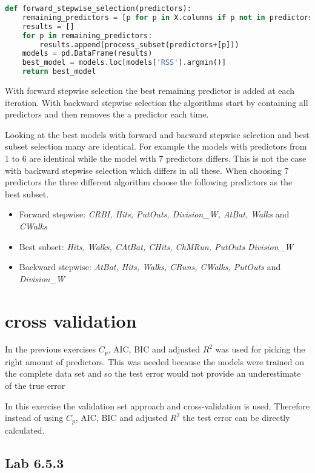 \begin{lstlisting}[language=Python, label=lst:forwardselection, caption=metricsUtil for calculating Cp\, BIC and RSS]
def forward_stepwise_selection(predictors):
	remaining_predictors = [p for p in X.columns if p not in predictors]
	results = []
	for p in remaining_predictors:
		results.append(process_subset(predictors+[p]))
	models = pd.DataFrame(results)
	best_model = models.loc[models['RSS'].argmin()]
	return best_model
\end{lstlisting}

With forward stepwise selection the best remaining predictor is added at each iteration. With backward stepwise selection the algorithms start by containing all predictors and then removes the a predictor each time. 

Looking at the best models with forward and bacward stepwise selection and best subset selection many are identical. For example the models with predictors from 1 to 6 are identical while the model with 7 predictors differs. This is not the case with backward stepwise selection which differs in all these. When choosing 7 predictors the three different algorithm choose the following predictors as the best subset.

\begin{itemize}
\item Forward stepwise: \emph{CRBI, Hits, PutOuts, Division\_W, AtBat, Walks} and \emph{CWalks}
\item Best subset: \emph{Hits, Walks, CAtBat, CHits, ChMRun, PutOuts} \emph{Division\_W}
\item Backward stepwise: \emph{AtBat, Hits, Walks, CRuns, CWalks, PutOuts} and \emph{Division\_W}
\end{itemize}

\section{cross validation}
In the previous exercises $C_p$, AIC, BIC and adjusted $R^2$ was used for picking the right amount of predictors. This was needed because the models were trained on the complete data set and so the test error would not provide an underestimate of the true error

In this exercise the validation set approach and cross-validation is used. Therefore instead of using $C_p$, AIC, BIC and adjusted $R^2$ the test error can be directly calculated. 
\subsection{Lab 6.5.3}

